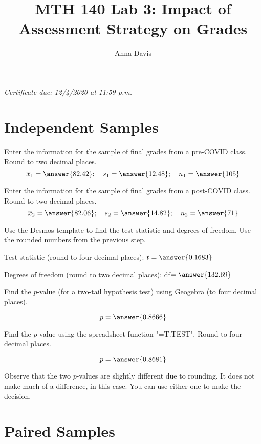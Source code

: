 \documentclass{ximera}
\author{Anna Davis} \title{MTH 140 Lab 3: Impact of Assessment Strategy on Grades}
\begin{document}
\begin{abstract}

\end{abstract}
\maketitle
 \textit{Certificate due: 12/4/2020 at 11:59 p.m.}
 \section{Independent Samples}
\begin{problem}\label{prob:140lab3prob1}
Enter the information for the sample of final grades from a pre-COVID class.
Round to two decimal places.
$$\overline{x}_1=\answer{82.42};\quad s_1=\answer{12.48};\quad n_1=\answer{105}$$

Enter the information for the sample of final grades from a post-COVID class.
Round to two decimal places.
$$\overline{x}_2=\answer{82.06};\quad s_2=\answer{14.82};\quad n_2=\answer{71}$$

Use the Desmos template to find the test statistic and degrees of freedom.  Use the rounded numbers from the previous step.

Test statistic (round to four decimal places): $t=\answer{0.1683}$

Degrees of freedom (round to two decimal places): df$=\answer{132.69}$

Find the $p$-value (for a two-tail hypothesis test) using Geogebra (to four decimal places).

\begin{center}  
\end{center}

$$p=\answer{0.8666}$$

Find the $p$-value using the spreadsheet function "=T.TEST".  Round to four decimal places.

$$p=\answer{0.8681}$$
\begin{warning}
Observe that the two $p$-values are slightly different due to rounding.  It does not make much of a difference, in this case.  You can use either one to make the decision.
\end{warning}
\end{problem}



\section{Paired Samples}
\end{document}
